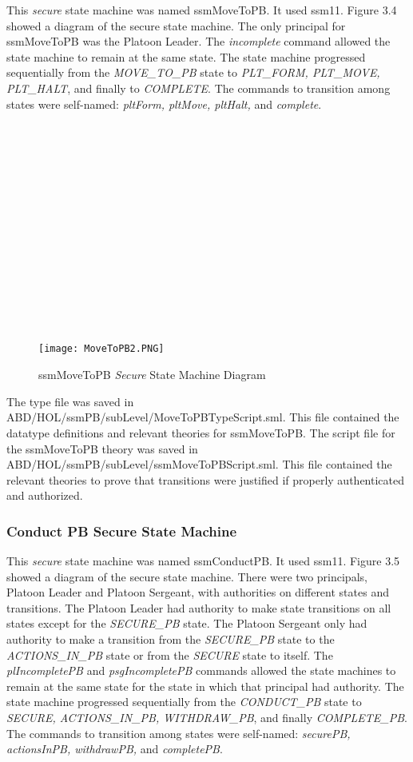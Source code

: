 This \emph{secure} state machine was named ssmMoveToPB. It used ssm11.  Figure 3.4 showed a diagram of the secure state machine.  The only principal for ssmMoveToPB was the Platoon Leader.   The \emph{incomplete} command allowed the state machine to remain at the same state.  The state machine progressed sequentially from the \emph{MOVE_TO_PB} state to \emph{PLT_FORM, PLT_MOVE, PLT_HALT}, and finally to \emph{COMPLETE}.  The commands to transition among states were self-named: \emph{pltForm, pltMove, pltHalt,} and \emph{complete}.  \\\\\\\\\\\\\\\\\\\\\\\\\\\\\\

\begin{figure}[h]
  \centering
  \texttt{[image: MoveToPB2.PNG]}
  \caption{ssmMoveToPB \emph{Secure} State Machine Diagram}
\end{figure}

The type file was saved in ABD/HOL/ssmPB/subLevel/MoveToPBTypeScript.sml.  This file contained the datatype definitions and relevant theories for ssmMoveToPB.  The script file for the ssmMoveToPB theory was saved in ABD/HOL/ssmPB/subLevel/ssmMoveToPBScript.sml. This file contained the relevant theories to prove that transitions were justified if properly authenticated and authorized.

\subsubsection{Conduct PB Secure State Machine}
\label{sec:conduct-pb-secure}

This \emph{secure} state machine was named ssmConductPB.  It used ssm11.  Figure 3.5 showed a diagram of the secure state machine. There were two principals, Platoon Leader and Platoon Sergeant, with authorities on different states and transitions.  The Platoon Leader had authority to make state transitions on all states except for the \emph{SECURE_PB} state.  The Platoon Sergeant only had authority to make a transition from the \emph{SECURE_PB} state to the \emph{ACTIONS_IN_PB} state or from the \emph{SECURE} state to itself.  The \emph{plIncompletePB} and \emph{psgIncompletePB} commands allowed the state machines to remain at the same state for the state in which that principal had authority.  The state machine progressed sequentially from the \emph{CONDUCT_PB} state to \emph{SECURE, ACTIONS_IN_PB, WITHDRAW_PB}, and finally \emph{COMPLETE_PB}.   The commands to transition among states were self-named: \emph{securePB, actionsInPB, withdrawPB,} and \emph{completePB}.

